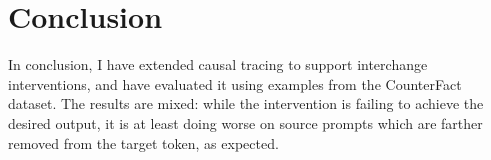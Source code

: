 \documentclass{article}
\begin{document}
\section{Conclusion}

In conclusion, I have extended causal tracing to support interchange interventions, and have evaluated it using examples from the CounterFact dataset. The results are mixed: while the intervention is failing to achieve the desired output, it is at least doing worse on source prompts which are farther removed from the target token, as expected. 

\printbibliography

\newpage
\appendix


\end{document}
